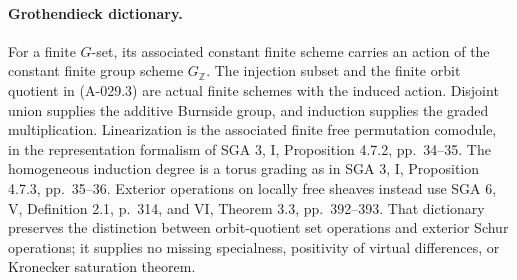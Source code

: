 \paragraph{Grothendieck dictionary.}
For a finite \(G\)-set, its associated constant finite scheme carries
an action of the constant finite group scheme \(G_{\mathbb Z}\).
The injection subset and the finite orbit quotient in (A-029.3)
are actual finite schemes with the induced action. Disjoint union
supplies the additive Burnside group, and induction supplies the
graded multiplication. Linearization is the associated finite free
permutation comodule, in the representation formalism of SGA 3, I,
Proposition 4.7.2, pp.~34--35. The homogeneous induction degree
is a torus grading as in SGA 3, I, Proposition 4.7.3, pp.~35--36.
Exterior operations on locally free sheaves instead use SGA 6, V,
Definition 2.1, p.~314, and VI, Theorem 3.3, pp.~392--393.
That dictionary preserves the distinction between orbit-quotient
set operations and exterior Schur operations; it supplies no
missing specialness, positivity of virtual differences, or
Kronecker saturation theorem.
